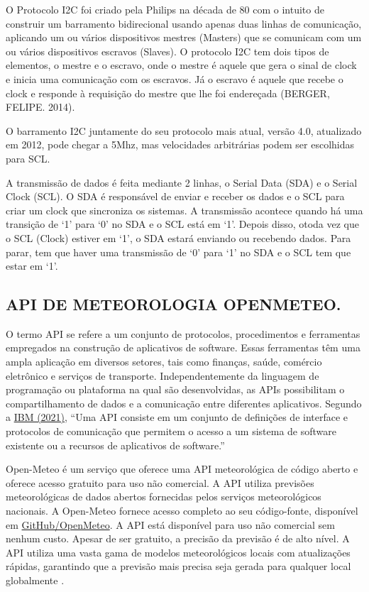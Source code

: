 \documentclass[%
  article,%
  a4paper,%
  12pt,%
  fleqn,%
  oneside,%
  chapter = TITLE,%
  section = TITLE,%
]{abntex2}
\begin{document}
O Protocolo I2C foi criado pela Philips na década de 80 com o intuito de construir um barramento bidirecional usando apenas duas linhas de comunicação, aplicando um ou vários dispositivos mestres (Masters) que se comunicam com um ou vários dispositivos escravos (Slaves). O protocolo I2C tem dois tipos de elementos, o mestre e o escravo, onde o mestre é aquele que gera o sinal de clock e inicia uma comunicação com os escravos. Já o escravo é aquele que recebe o clock e responde à requisição do mestre que lhe foi endereçada  (BERGER, FELIPE. 2014).

O barramento I2C juntamente do seu protocolo mais atual, versão 4.0, atualizado em 2012, pode chegar a 5Mhz, mas velocidades arbitrárias podem ser escolhidas para SCL.

A transmissão de dados é feita mediante 2 linhas, o Serial Data (SDA) e o Serial Clock (SCL). O SDA é responsável de enviar e receber os dados e o SCL para criar um clock que sincroniza os sistemas. A transmissão acontece quando há uma transição de `1' para `0' no SDA e o SCL está em `1'. Depois disso, otoda vez que o SCL (Clock) estiver em `1', o SDA estará enviando ou recebendo dados. Para parar, tem que haver uma transmissão de `0' para `1' no SDA e o SCL tem que estar em `1'.

\subsection{API DE METEOROLOGIA OPENMETEO. }

O termo API se refere a um conjunto de protocolos, procedimentos e ferramentas empregados na construção de aplicativos de software. Essas ferramentas têm uma ampla aplicação em diversos setores, tais como finanças, saúde, comércio eletrônico e serviços de transporte. Independentemente da linguagem de programação ou plataforma na qual são desenvolvidas, as APIs possibilitam o compartilhamento de dados e a comunicação entre diferentes aplicativos. Segundo a \href{https://www.ibm.com/br-pt/topics/api}{IBM (2021)}, “Uma API consiste em um conjunto de definições de interface e protocolos de comunicação que permitem o acesso a um sistema de software existente ou a recursos de aplicativos de software.”

Open-Meteo é um serviço que oferece uma API meteorológica de código aberto e oferece acesso gratuito para uso não comercial. A API utiliza previsões meteorológicas de dados abertos fornecidas pelos serviços meteorológicos nacionais. A Open-Meteo fornece acesso completo ao seu código-fonte, disponível em \href{https://github.com/open-meteo/open-meteo}{GitHub/OpenMeteo}.
A API está disponível para uso não comercial sem nenhum custo. Apesar de ser gratuito, a precisão da previsão é de alto nível. A API utiliza uma vasta gama de modelos meteorológicos locais com atualizações rápidas, garantindo que a previsão mais precisa seja gerada para qualquer local globalmente \cite{OpenMeteoAPI}. 
\end{document}
